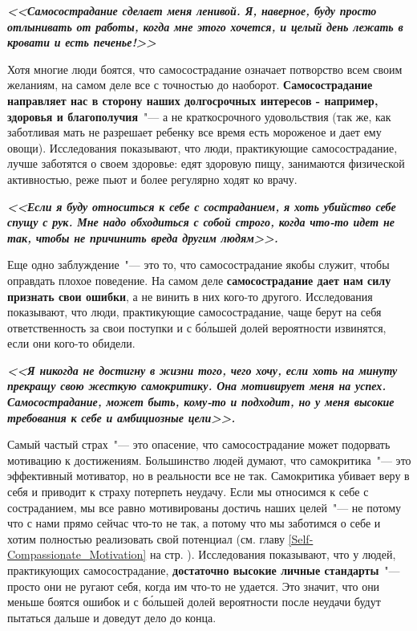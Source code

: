 \vspace{4ex}

\textbf{\textit{<<Самосострадание сделает меня ленивой. Я, наверное, буду просто отлынивать от работы, когда мне этого хочется, и целый день лежать в кровати и есть печенье!>>}}

\vspace{2ex}

Хотя многие люди боятся, что самосострадание означает потворство всем своим желаниям, на самом деле все с точностью до наоборот. \textbf{Самосострадание направляет нас в сторону наших долгосрочных интересов - например, здоровья и благополучия}~"--- а не краткосрочного удовольствия (так же, как заботливая мать не разрешает ребенку все время есть мороженое и дает ему овощи).  Исследования показывают, что люди, практикующие самосострадание, лучше заботятся о своем здоровье: едят здоровую пищу, занимаются физической активностью, реже пьют и более регулярно ходят ко врачу. 

\vspace{4ex}

\textbf{\textit{<<Если я буду относиться к себе с состраданием, я хоть убийство себе спущу с рук. Мне надо обходиться с собой строго, когда что-то идет не так, чтобы не причинить вреда другим людям>>.}}

\vspace{2ex}

Еще одно заблуждение~"--- это то, что самосострадание якобы служит, чтобы оправдать плохое поведение. На самом деле \textbf{самосострадание дает нам силу признать свои ошибки}, а не винить в них кого-то другого. Исследования показывают, что люди, практикующие самосострадание, чаще берут на себя ответственность за свои поступки и с б\'{о}льшей долей вероятности извинятся, если они кого-то обидели. 

\vspace{4ex}
\textbf{\textit{
<<Я никогда не достигну в жизни того, чего хочу, если хоть на минуту прекращу свою жесткую самокритику. Она мотивирует меня на успех. Самосострадание, может быть, кому-то и подходит, но у меня высокие требования к себе и амбициозные цели>>.}}

\vspace{2ex}
 
Самый частый страх~"--- это опасение, что самосострадание может подорвать мотивацию к достижениям. Большинство людей думают, что самокритика~"--- это эффективный мотиватор, но в реальности все не так. Самокритика убивает веру в себя и приводит к страху потерпеть неудачу. Если мы относимся к себе с состраданием, мы все равно мотивированы достичь наших целей~"--- не потому что с нами прямо сейчас что-то не так, а потому что мы заботимся о себе и хотим полностью реализовать свой потенциал (см. главу \ref{Self-Compassionate_Motivation} на стр. \pageref{Self-Compassionate_Motivation}). Исследования показывают, что у людей, практикующих самосострадание, \textbf{достаточно высокие личные стандарты}~"--- просто они не ругают себя, когда им что-то не удается. Это значит, что они меньше боятся ошибок и с б\'{о}льшей долей вероятности после неудачи будут пытаться дальше и доведут дело до конца. 

